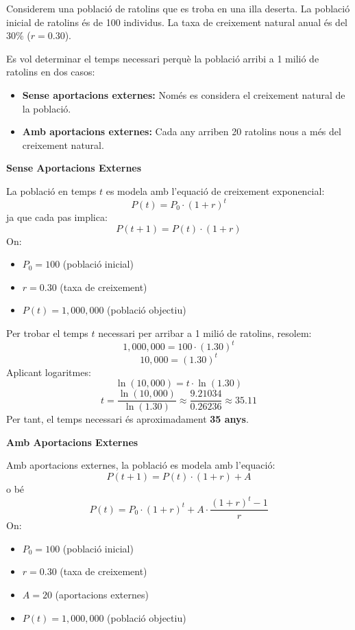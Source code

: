 \Exercise  
Considerem una població de ratolins que es troba en una illa deserta. La població inicial de ratolins és de 100 individus. La taxa de creixement natural anual és del 30\% (\( r = 0.30 \)). 

Es vol determinar el temps necessari perquè la població arribi a 1 milió de ratolins en dos casos:

\begin{itemize}
    \item \textbf{Sense aportacions externes:} Només es considera el creixement natural de la població.
    \item \textbf{Amb aportacions externes:} Cada any arriben 20 ratolins nous a més del creixement natural.
\end{itemize}


\Answer


\textbf{Sense Aportacions Externes}

La població en temps \( t \) es modela amb l'equació de creixement exponencial:
\[
P(t) = P_0 \cdot (1 + r)^t
\]
ja que cada pas implica:
\[
P(t+1) = P(t) \cdot (1 + r)
\]
On:
\begin{itemize}
    \item \( P_0 = 100 \) (població inicial)
    \item \( r = 0.30 \) (taxa de creixement)
    \item \( P(t) = 1{,}000{,}000 \) (població objectiu)
\end{itemize}

Per trobar el temps \( t \) necessari per arribar a 1 milió de ratolins, resolem:
\[
1{,}000{,}000 = 100 \cdot (1.30)^t
\]
\[
10{,}000 = (1.30)^t
\]
Aplicant logaritmes:
\[
\ln(10{,}000) = t \cdot \ln(1.30)
\]
\[
t = \frac{\ln(10{,}000)}{\ln(1.30)} \approx \frac{9.21034}{0.26236} \approx 35.11
\]
Per tant, el temps necessari és aproximadament \textbf{35 anys}.

\textbf{Amb Aportacions Externes}

Amb aportacions externes, la població es modela amb l'equació:
\[
P(t+1) = P(t) \cdot (1 + r) + A
\]
o bé
\[
P(t) = P_0 \cdot (1 + r)^t + A \cdot \frac{(1 + r)^t - 1}{r}
\]
On:
\begin{itemize}
    \item \( P_0 = 100 \) (població inicial)
    \item \( r = 0.30 \) (taxa de creixement)
    \item \( A = 20 \) (aportacions externes)
    \item \( P(t) = 1{,}000{,}000 \) (població objectiu)
\end{itemize}

